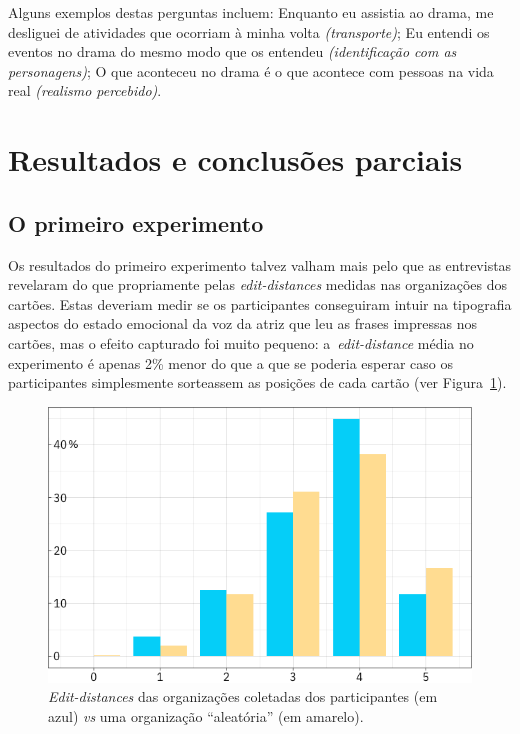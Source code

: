 \documentclass[a4paper]{tufte-handout}
\newcommand{\textls}[2][5]{%
    \begingroup\addfontfeatures{LetterSpace=#1}#2\endgroup
  }
\renewcommand{\smallcapsspacing}[1]{\textls[10]{#1}}
\renewcommand{\textsc}[1]{\smallcapsspacing{\textsmallcaps{#1}}}
\begin{document}
Alguns exemplos destas perguntas incluem: Enquanto eu assistia ao drama, me desliguei de atividades que ocorriam à minha volta \textit{(transporte)}; Eu entendi os eventos no drama do mesmo modo que \textsc{xxx} os entendeu \textit{(identificação com as personagens)}; O que aconteceu no drama é o que acontece com pessoas na vida real \textit{(realismo percebido)}.


\pagebreak 

\section{Resultados e conclusões parciais}\label{sec:resultados}

\subsection{O primeiro experimento}\label{result_prim_exp}

Os resultados do primeiro experimento talvez valham mais pelo que as entrevistas revelaram do que propriamente pelas \textit{edit-distances} medidas nas organizações dos cartões. Estas deveriam medir se os participantes conseguiram intuir na tipografia aspectos do estado emocional da voz da atriz que leu  as frases impressas nos cartões, mas o efeito capturado foi muito pequeno: a~\textit{edit-distance} média no experimento é apenas 2\% menor do que a que se poderia esperar caso os participantes simplesmente sorteassem as posições de cada cartão (ver Figura~\ref{edit_dist_1}).

\begin{figure}
  \includegraphics{imgs/edit_distance_reais.png}
  \caption{\textit{Edit-distances} das organizações coletadas dos participantes (em azul) \textit{vs} uma organização ``aleatória'' (em amarelo).}
  \label{edit_dist_1}
\end{figure}
\end{document}
